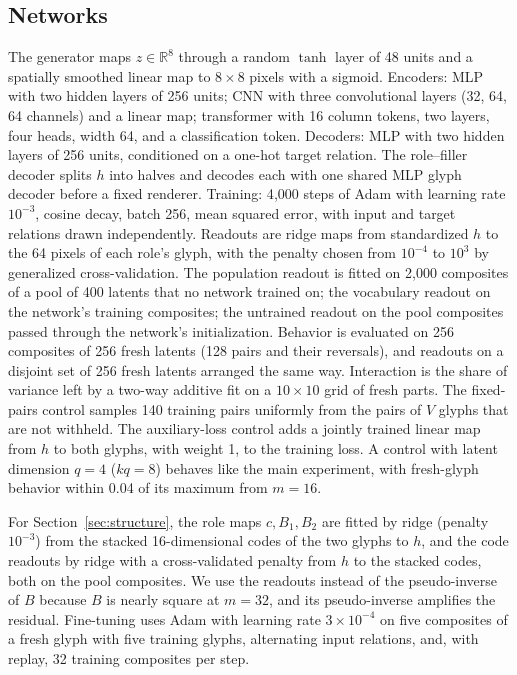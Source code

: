 \documentclass[10pt]{article}
\theoremstyle{plain}
\theoremstyle{remark}
\newcommand{\R}{\mathbb{R}}
\begin{document}
\subsection{Networks}
The generator maps $z \in \R^8$ through a random $\tanh$ layer of 48 units and a spatially smoothed linear map to $8 \times 8$ pixels with a sigmoid. Encoders: MLP with two hidden layers of 256 units; CNN with three convolutional layers (32, 64, 64 channels) and a linear map; transformer with 16 column tokens, two layers, four heads, width 64, and a classification token. Decoders: MLP with two hidden layers of 256 units, conditioned on a one-hot target relation. The role--filler decoder splits $h$ into halves and decodes each with one shared MLP glyph decoder before a fixed renderer. Training: 4{,}000 steps of Adam with learning rate $10^{-3}$, cosine decay, batch 256, mean squared error, with input and target relations drawn independently. Readouts are ridge maps from standardized $h$ to the 64 pixels of each role's glyph, with the penalty chosen from $10^{-4}$ to $10^{3}$ by generalized cross-validation. The population readout is fitted on 2{,}000 composites of a pool of 400 latents that no network trained on; the vocabulary readout on the network's training composites; the untrained readout on the pool composites passed through the network's initialization. Behavior is evaluated on 256 composites of 256 fresh latents (128 pairs and their reversals), and readouts on a disjoint set of 256 fresh latents arranged the same way. Interaction is the share of variance left by a two-way additive fit on a $10 \times 10$ grid of fresh parts. The fixed-pairs control samples 140 training pairs uniformly from the pairs of $V$ glyphs that are not withheld. The auxiliary-loss control adds a jointly trained linear map from $h$ to both glyphs, with weight 1, to the training loss. A control with latent dimension $q = 4$ ($kq = 8$) behaves like the main experiment, with fresh-glyph behavior within 0.04 of its maximum from $m = 16$.

For Section~\ref{sec:structure}, the role maps $c, B_1, B_2$ are fitted by ridge (penalty $10^{-3}$) from the stacked 16-dimensional codes of the two glyphs to $h$, and the code readouts by ridge with a cross-validated penalty from $h$ to the stacked codes, both on the pool composites. We use the readouts instead of the pseudo-inverse of $B$ because $B$ is nearly square at $m = 32$, and its pseudo-inverse amplifies the residual. Fine-tuning uses Adam with learning rate $3 \times 10^{-4}$ on five composites of a fresh glyph with five training glyphs, alternating input relations, and, with replay, 32 training composites per step.
\end{document}
